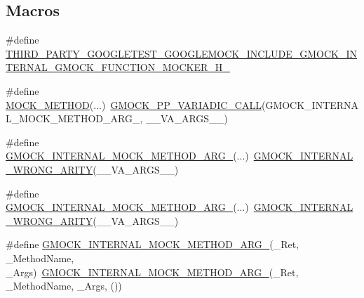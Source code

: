 \subsection*{Macros}
\begin{DoxyCompactItemize}
\item 
\#define \mbox{\hyperlink{googletest-master_2googlemock_2include_2gmock_2gmock-function-mocker_8h_a790cf5a76ad32864f1e29495e30d2df2}{T\+H\+I\+R\+D\+\_\+\+P\+A\+R\+T\+Y\+\_\+\+G\+O\+O\+G\+L\+E\+T\+E\+S\+T\+\_\+\+G\+O\+O\+G\+L\+E\+M\+O\+C\+K\+\_\+\+I\+N\+C\+L\+U\+D\+E\+\_\+\+G\+M\+O\+C\+K\+\_\+\+I\+N\+T\+E\+R\+N\+A\+L\+\_\+\+G\+M\+O\+C\+K\+\_\+\+F\+U\+N\+C\+T\+I\+O\+N\+\_\+\+M\+O\+C\+K\+E\+R\+\_\+\+H\+\_\+}}
\item 
\#define \mbox{\hyperlink{googletest-master_2googlemock_2include_2gmock_2gmock-function-mocker_8h_a05ffc29d0784b131ee178da190d31397}{M\+O\+C\+K\+\_\+\+M\+E\+T\+H\+OD}}(...)~\mbox{\hyperlink{_obj__test_2lib_2googletest-master_2googlemock_2include_2gmock_2internal_2gmock-pp_8h_a4dd8715f753c7c3957f7185acf609e55}{G\+M\+O\+C\+K\+\_\+\+P\+P\+\_\+\+V\+A\+R\+I\+A\+D\+I\+C\+\_\+\+C\+A\+LL}}(G\+M\+O\+C\+K\+\_\+\+I\+N\+T\+E\+R\+N\+A\+L\+\_\+\+M\+O\+C\+K\+\_\+\+M\+E\+T\+H\+O\+D\+\_\+\+A\+R\+G\+\_\+, \+\_\+\+\_\+\+V\+A\+\_\+\+A\+R\+G\+S\+\_\+\+\_\+)
\item 
\#define \mbox{\hyperlink{googletest-master_2googlemock_2include_2gmock_2gmock-function-mocker_8h_aa4f34502611b33621e18725a56f4d011}{G\+M\+O\+C\+K\+\_\+\+I\+N\+T\+E\+R\+N\+A\+L\+\_\+\+M\+O\+C\+K\+\_\+\+M\+E\+T\+H\+O\+D\+\_\+\+A\+R\+G\+\_}}(...)~\mbox{\hyperlink{_obj__test_2lib_2googletest-master_2googlemock_2include_2gmock_2gmock-function-mocker_8h_a592456f4bfcfc9a9a3a6b1482ed569f4}{G\+M\+O\+C\+K\+\_\+\+I\+N\+T\+E\+R\+N\+A\+L\+\_\+\+W\+R\+O\+N\+G\+\_\+\+A\+R\+I\+TY}}(\+\_\+\+\_\+\+V\+A\+\_\+\+A\+R\+G\+S\+\_\+\+\_\+)
\item 
\#define \mbox{\hyperlink{googletest-master_2googlemock_2include_2gmock_2gmock-function-mocker_8h_a4a857a2d13828d2b65ac09eb47f3d36c}{G\+M\+O\+C\+K\+\_\+\+I\+N\+T\+E\+R\+N\+A\+L\+\_\+\+M\+O\+C\+K\+\_\+\+M\+E\+T\+H\+O\+D\+\_\+\+A\+R\+G\+\_}}(...)~\mbox{\hyperlink{_obj__test_2lib_2googletest-master_2googlemock_2include_2gmock_2gmock-function-mocker_8h_a592456f4bfcfc9a9a3a6b1482ed569f4}{G\+M\+O\+C\+K\+\_\+\+I\+N\+T\+E\+R\+N\+A\+L\+\_\+\+W\+R\+O\+N\+G\+\_\+\+A\+R\+I\+TY}}(\+\_\+\+\_\+\+V\+A\+\_\+\+A\+R\+G\+S\+\_\+\+\_\+)
\item 
\#define \mbox{\hyperlink{googletest-master_2googlemock_2include_2gmock_2gmock-function-mocker_8h_a7af2c00ea7b5cdbdf7129e5d9296fdad}{G\+M\+O\+C\+K\+\_\+\+I\+N\+T\+E\+R\+N\+A\+L\+\_\+\+M\+O\+C\+K\+\_\+\+M\+E\+T\+H\+O\+D\+\_\+\+A\+R\+G\+\_}}(\+\_\+\+Ret,  \+\_\+\+Method\+Name,  \+\_\+\+Args)~\mbox{\hyperlink{_obj__test_2lib_2googletest-master_2googlemock_2include_2gmock_2gmock-function-mocker_8h_ad8a2523f8167f8c85b082c8c65f31b87}{G\+M\+O\+C\+K\+\_\+\+I\+N\+T\+E\+R\+N\+A\+L\+\_\+\+M\+O\+C\+K\+\_\+\+M\+E\+T\+H\+O\+D\+\_\+\+A\+R\+G\+\_}}(\+\_\+\+Ret, \+\_\+\+Method\+Name, \+\_\+\+Args, ())

\end{DoxyCompactItemize}
